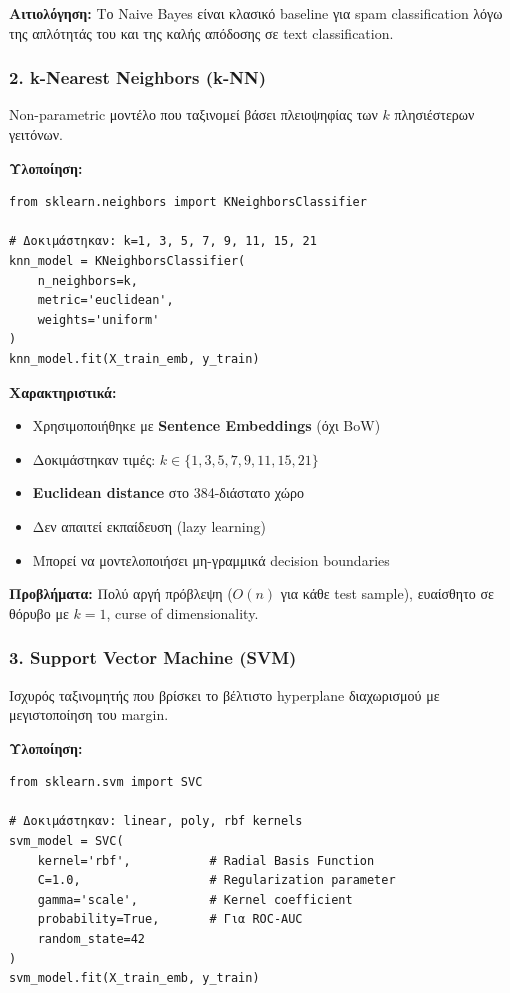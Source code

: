 \documentclass[12pt,a4paper,twoside]{book}
\begin{document}
\textbf{Αιτιολόγηση:} Το Naive Bayes είναι κλασικό baseline για spam classification λόγω της απλότητάς του και της καλής απόδοσης σε text classification.

\subsubsection*{2. k-Nearest Neighbors (k-NN)}

Non-parametric μοντέλο που ταξινομεί βάσει πλειοψηφίας των \(k\) πλησιέστερων
γειτόνων.

\textbf{Υλοποίηση:}
\begin{tcolorbox}[myCustomStyle={k-Nearest Neighbors}]
    \begin{lstlisting}[style=myPythonStyle]
from sklearn.neighbors import KNeighborsClassifier

# Δοκιμάστηκαν: k=1, 3, 5, 7, 9, 11, 15, 21
knn_model = KNeighborsClassifier(
    n_neighbors=k,
    metric='euclidean',
    weights='uniform'
)
knn_model.fit(X_train_emb, y_train)
\end{lstlisting}
\end{tcolorbox}

\textbf{Χαρακτηριστικά:}
\begin{itemize}
    \item Χρησιμοποιήθηκε με \textbf{Sentence Embeddings} (όχι BoW)
    \item Δοκιμάστηκαν τιμές: \(k \in \{1, 3, 5, 7, 9, 11, 15, 21\}\)
    \item \textbf{Euclidean distance} στο 384-διάστατο χώρο
    \item Δεν απαιτεί εκπαίδευση (lazy learning)
    \item Μπορεί να μοντελοποιήσει μη-γραμμικά decision boundaries
\end{itemize}

\textbf{Προβλήματα:} Πολύ αργή πρόβλεψη (\(O(n)\) για κάθε test sample), ευαίσθητο σε θόρυβο με \(k=1\), curse of dimensionality.

\subsubsection*{3. Support Vector Machine (SVM)}

Ισχυρός ταξινομητής που βρίσκει το βέλτιστο hyperplane διαχωρισμού με μεγιστοποίηση του margin.

\textbf{Υλοποίηση:}
\begin{tcolorbox}[myCustomStyle={Support Vector Machine}]
    \begin{lstlisting}[style=myPythonStyle]
from sklearn.svm import SVC

# Δοκιμάστηκαν: linear, poly, rbf kernels
svm_model = SVC(
    kernel='rbf',           # Radial Basis Function
    C=1.0,                  # Regularization parameter
    gamma='scale',          # Kernel coefficient
    probability=True,       # Για ROC-AUC
    random_state=42
)
svm_model.fit(X_train_emb, y_train)
\end{lstlisting}
\end{tcolorbox}
\end{document}
